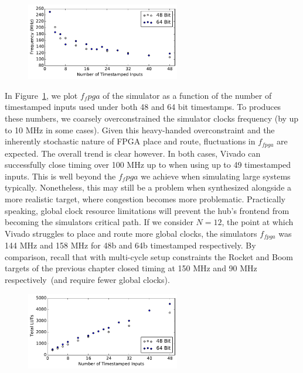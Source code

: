 \begin{figure}
    \centering
    \includegraphics[width=0.6\textwidth]{figures/pdes--hub-fmax-scaling.pdf}
    \caption{}
    \label{fig:pdes-hub-fmax-scaling}
\end{figure}

In Figure~\ref{fig:pdes-hub-fmax-scaling}, we plot $f_fpga$ of the simulator as
a function of the number of timestamped inputs used under both 48 and 64 bit
timestamps. To produces these numbers, we coarsely overconstrained the
simulator clocks frequency (by up to 10 MHz in some cases). Given this
heavy-handed overconstraint and the inherently stochastic nature of FPGA place
and route, fluctuations in $f_{fpga}$ are expected. The overall trend is clear
however.  In both cases, Vivado can successfully close timing over 100 MHz up
to when using up to 49 timestamped inputs. This is well beyond the $f_fpga$ we
achieve when simulating large systems typically. Nonetheless, this may still be
a problem when synthesized alongside a more realistic target, where congestion
becomes more problematic. Practically speaking, global clock resource
limitations will prevent the hub's frontend from becoming the simulators
critical path. If we consider $N=12$, the point at which Vivado struggles to
place and route more global clocks, the simulators $f_{fpga}$ was 144 MHz and
158 MHz for 48b and 64b timestamped respectively. By comparison, recall that
with multi-cycle setup constraints the Rocket and Boom targets of the previous
chapter closed timing at 150 MHz and 90 MHz respectively~(and require fewer
global clocks).

\begin{figure}
    \centering
    \includegraphics[width=0.6\textwidth]{figures/pdes-hub-lut-scaling.pdf}
    \caption{}
    \label{fig:pdes-hub-lut-scaling}
\end{figure}

